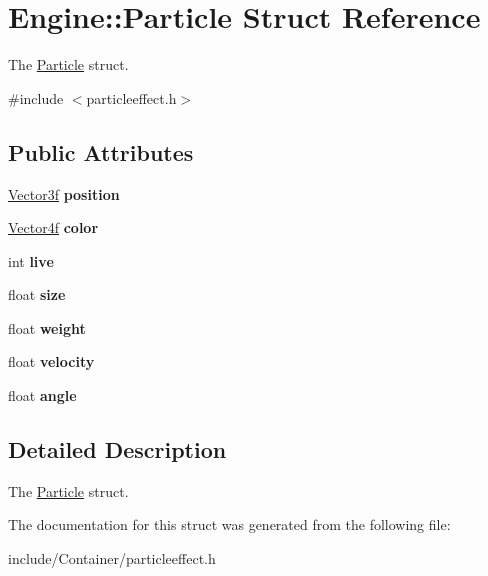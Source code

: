 \hypertarget{structEngine_1_1Particle}{}\section{Engine\+:\+:Particle Struct Reference}
\label{structEngine_1_1Particle}


The \hyperlink{structEngine_1_1Particle}{Particle} struct.  




{\ttfamily \#include $<$particleeffect.\+h$>$}

\subsection*{Public Attributes}
\begin{DoxyCompactItemize}
\item 
\hypertarget{structEngine_1_1Particle_a5bd3c23a2e7cdc8c166b75a98180e8bf}{}\hyperlink{classVector3}{Vector3f} {\bfseries position}\label{structEngine_1_1Particle_a5bd3c23a2e7cdc8c166b75a98180e8bf}

\item 
\hypertarget{structEngine_1_1Particle_a43fcf0b266f64000f8ad56265dd53be0}{}\hyperlink{classVector4}{Vector4f} {\bfseries color}\label{structEngine_1_1Particle_a43fcf0b266f64000f8ad56265dd53be0}

\item 
\hypertarget{structEngine_1_1Particle_a251e0e822d372c9a6535db59275595b4}{}int {\bfseries live}\label{structEngine_1_1Particle_a251e0e822d372c9a6535db59275595b4}

\item 
\hypertarget{structEngine_1_1Particle_a614f315262346ca051af24a1eb0a28cc}{}float {\bfseries size}\label{structEngine_1_1Particle_a614f315262346ca051af24a1eb0a28cc}

\item 
\hypertarget{structEngine_1_1Particle_af5241552092532002f63abbb5c63333d}{}float {\bfseries weight}\label{structEngine_1_1Particle_af5241552092532002f63abbb5c63333d}

\item 
\hypertarget{structEngine_1_1Particle_a7afa0ce2dde10da32acc0e70dbfb9e36}{}float {\bfseries velocity}\label{structEngine_1_1Particle_a7afa0ce2dde10da32acc0e70dbfb9e36}

\item 
\hypertarget{structEngine_1_1Particle_acbc6f4d5ffa816672fc16bdf2b2cef5e}{}float {\bfseries angle}\label{structEngine_1_1Particle_acbc6f4d5ffa816672fc16bdf2b2cef5e}

\end{DoxyCompactItemize}


\subsection{Detailed Description}
The \hyperlink{structEngine_1_1Particle}{Particle} struct. 

The documentation for this struct was generated from the following file\+:\begin{DoxyCompactItemize}
\item 
include/\+Container/particleeffect.\+h\end{DoxyCompactItemize}

